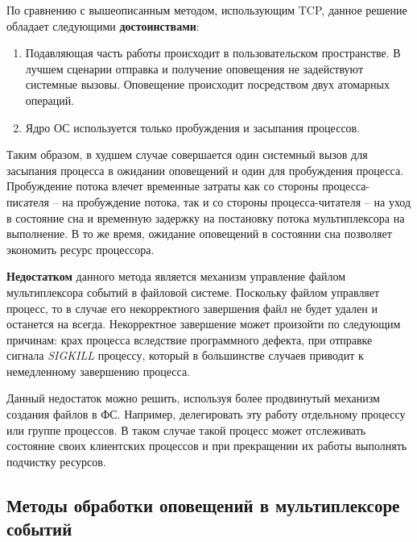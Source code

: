 По сравнению с вышеописанным методом, использующим TCP, данное решение обладает следующими \textbf{достоинствами}:
\begin{enumerate}
\item Подавляющая часть работы происходит в пользовательском пространстве. В лучшем сценарии отправка и получение оповещения не задействуют системные вызовы. Оповещение происходит посредством двух атомарных операций.
\item Ядро ОС используется только пробуждения и засыпания процессов.
\end{enumerate}

Таким образом, в худшем случае совершается один системный вызов для засыпания процесса в ожидании оповещений и один для пробуждения процесса. Пробуждение потока влечет временные затраты как со стороны процесса-писателя -- на пробуждение потока, так и со стороны процесса-читателя -- на уход в состояние сна и временную задержку на постановку потока мультиплексора на выполнение. В то же время, ожидание оповещений в состоянии сна позволяет экономить ресурс процессора.

\textbf{Недостатком} данного метода является механизм управление файлом мультиплексора событий в файловой системе. Поскольку файлом управляет процесс, то в случае его некорректного завершения файл не будет удален и останется на всегда. Некорректное завершение может произойти по следующим причинам: крах процесса вследствие программного дефекта, при отправке сигнала \textit{SIGKILL} процессу, который в большинстве случаев приводит к немедленному завершению процесса.

Данный недостаток можно решить, используя более продвинутый механизм создания файлов в ФС. Например, делегировать эту работу отдельному процессу или группе процессов. В таком случае такой процесс может отслеживать состояние своих клиентских процессов и при прекращении их работы выполнять подчистку ресурсов.

\subsection{Методы обработки оповещений в мультиплексоре событий}

